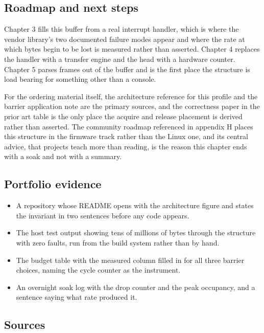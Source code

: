 \subsection*{Roadmap and next steps}

Chapter 3 fills this buffer from a real interrupt handler, which is where the
vendor library's two documented failure modes appear and where the rate at which
bytes begin to be lost is measured rather than asserted. Chapter 4 replaces the
handler with a transfer engine and the head with a hardware counter. Chapter 5
parses frames out of the buffer and is the first place the structure is load
bearing for something other than a console.

For the ordering material itself, the architecture reference for this profile
and the barrier application note are the primary sources, and the correctness
paper in the prior art table is the only place the acquire and release placement
is derived rather than asserted. The community roadmap referenced in appendix H
places this structure in the firmware track rather than the Linux one, and its
central advice, that projects teach more than reading, is the reason this
chapter ends with a soak and not with a summary.

\subsection*{Portfolio evidence}

\begin{itemize}
\item A repository whose README opens with the architecture figure and states
the invariant in two sentences before any code appears.
\item The host test output showing tens of millions of bytes through the structure with
zero faults, run from the build system rather than by hand.
\item The budget table with the measured column filled in for all three barrier
choices, naming the cycle counter as the instrument.
\item An overnight soak log with the drop counter and the peak occupancy, and a
sentence saying what rate produced it.
\end{itemize}

\subsection*{Sources}

